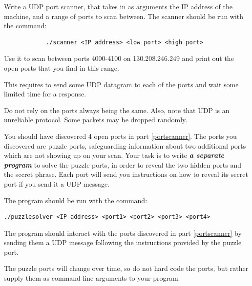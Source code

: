 \documentclass[9pt, addpoints]{exam}
\begin{document}
\begin{questions}

    \question[40]
    \label{portscanner}
         Write a UDP port scanner, that takes in as arguments the IP address
         of the machine, and a range of ports to scan between. The scanner
            should be run with the command:
    
         \begin{lstlisting}
            ./scanner <IP address> <low port> <high port>
         \end{lstlisting}
    
         Use it to scan between ports 4000-4100 on 130.208.246.249 and print out
         the open ports that you find in this range.
         
         This requires to send some UDP datagram to each of the ports and wait some limited time for a response. 
    
         Do not rely on the ports always being the same. Also, note that UDP is an unreliable protocol. Some packets may be dropped randomly.
         
    \par    
    \question[30]
        \label{puzzleports}
        You should have discovered 4 open ports in part \ref{portscanner}.
        The ports you discovered are puzzle ports, safeguarding information about two additional ports which are not showing up on your scan.
        Your task is to write \emph{\textbf{a separate program}} to solve the puzzle ports, in order to reveal the two hidden ports and the secret phrase.
        Each port will send you instructions on how to reveal its secret port if you send it a UDP message.
        
        The program should be run with the command:
         \begin{lstlisting}
./puzzlesolver <IP address> <port1> <port2> <port3> <port4>
         \end{lstlisting}
        
       The program should interact with the ports discovered in part \ref{portscanner} by sending them a UDP message following the instructions provided by the puzzle port. 
       
       The puzzle ports will change over time, so do not hard code the ports, but rather supply them as command line arguments to your program.
        

\end{questions}
\end{document}
